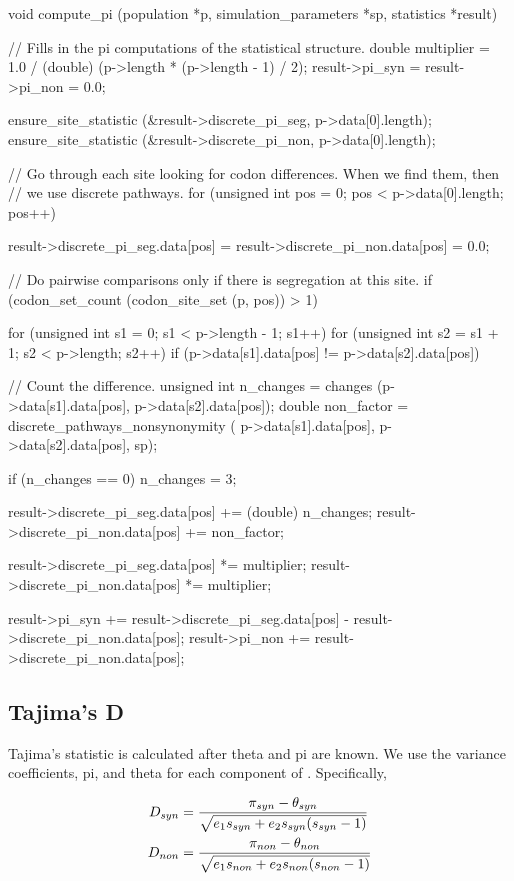 \documentclass{article}
\begin{document}
\begin{ccode}
void compute_pi (population *p, simulation_parameters *sp, statistics *result) {
  // Fills in the pi computations of the statistical structure.
  double multiplier = 1.0 / (double) (p->length * (p->length - 1) / 2);
  result->pi_syn = result->pi_non = 0.0;

  ensure_site_statistic (&result->discrete_pi_seg, p->data[0].length);
  ensure_site_statistic (&result->discrete_pi_non, p->data[0].length);

  // Go through each site looking for codon differences. When we find them, then
  // we use discrete pathways.
  for (unsigned int pos = 0; pos < p->data[0].length; pos++) {
    result->discrete_pi_seg.data[pos] =
      result->discrete_pi_non.data[pos] = 0.0;

    // Do pairwise comparisons only if there is segregation at this site.
    if (codon_set_count (codon_site_set (p, pos)) > 1) {
      for (unsigned int s1 = 0; s1 < p->length - 1; s1++)
	for (unsigned int s2 = s1 + 1; s2 < p->length; s2++)
	  if (p->data[s1].data[pos] != p->data[s2].data[pos]) {
	    // Count the difference.
	    unsigned int	n_changes  = changes (p->data[s1].data[pos], p->data[s2].data[pos]);
	    double		non_factor = discrete_pathways_nonsynonymity (
	      p->data[s1].data[pos], p->data[s2].data[pos], sp);

	    if (n_changes == 0) n_changes = 3;

	    result->discrete_pi_seg.data[pos] += (double) n_changes;
	    result->discrete_pi_non.data[pos] += non_factor;
	  }

      result->discrete_pi_seg.data[pos] *= multiplier;
      result->discrete_pi_non.data[pos] *= multiplier;
    }

    result->pi_syn += result->discrete_pi_seg.data[pos] - result->discrete_pi_non.data[pos];
    result->pi_non += result->discrete_pi_non.data[pos];
  }
}
\end{ccode}

    \subsection{Tajima's D}
      \label{sec:d-statistic}

      Tajima's \D{} statistic is calculated after theta and pi are known. We use
      the variance coefficients, pi, and theta for each component of \D{}.
      Specifically,

      \begin{align*}
	D_{syn} & = {\pi_{syn} - \theta_{syn} \over
		     \sqrt{e_1 s_{syn} + e_2 s_{syn} (s_{syn} - 1)}} \\ %
	D_{non} & = {\pi_{non} - \theta_{non} \over
		     \sqrt{e_1 s_{non} + e_2 s_{non} (s_{non} - 1)}}
      \end{align*}
\end{document}
